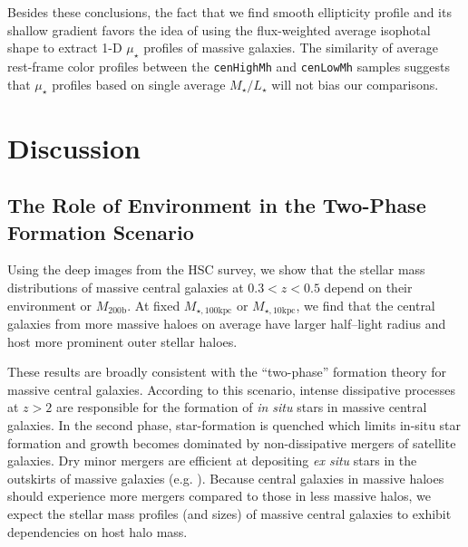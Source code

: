 \documentclass[a4paper,fleqn,usenatbib]{mnras}
\def\rbcg{\texttt{cenHighMh}}
\def\nbcg{\texttt{cenLowMh}}
\def\mhalo{{$M_{\mathrm{200b}}$}}
\def\minn{{$M_{\star,10\mathrm{kpc}}$}}
\def\mtot{{$M_{\star,100\mathrm{kpc}}$}}
\def\m2l{{$M_{\star}/L_{\star}$}}
\def\mden{{$\mu_{\star}$}}
\begin{document}
    Besides these conclusions, the fact that we find smooth ellipticity profile and 
    its shallow gradient favors the idea of using the flux-weighted average isophotal 
    shape to extract 1-D \mden{} profiles of massive galaxies. 
    The similarity of average rest-frame color profiles between the \rbcg{} and \nbcg{}
    samples suggests that \mden{} profiles based on single average \m2l{} will not bias 
    our comparisons. 
    
   

\section{Discussion}
    \label{sec:discussion}

\subsection{The Role of Environment in the Two-Phase Formation Scenario}
            
    Using the deep images from the HSC survey, we show that the stellar mass 
    distributions of massive central galaxies at $0.3 < z < 0.5$ depend on their 
    environment or \mhalo{}. 
    At fixed \mtot{} or \minn{}, we find that the central galaxies from more massive 
    haloes on average have larger half--light radius and host more prominent outer 
    stellar haloes. 
    
    These results are broadly consistent with the ``two-phase'' formation theory for 
    massive central galaxies. 
    According to this scenario, intense dissipative processes at $z > 2$ are responsible 
    for the formation of \textit{in situ} stars in massive central galaxies. 
    In the second phase, star-formation is quenched which limits in-situ star formation 
    and growth becomes dominated by non-dissipative mergers of satellite galaxies. 
    Dry minor mergers are efficient at depositing \textit{ex situ} stars in the 
    outskirts of massive galaxies (e.g. \citealt{Oogi2013, Bedorf2013}). 
    Because central galaxies in massive haloes should experience more mergers compared 
    to those in less massive halos, we expect the stellar mass profiles (and sizes) of 
    massive central galaxies to exhibit dependencies on host halo mass.
   
\end{document}

